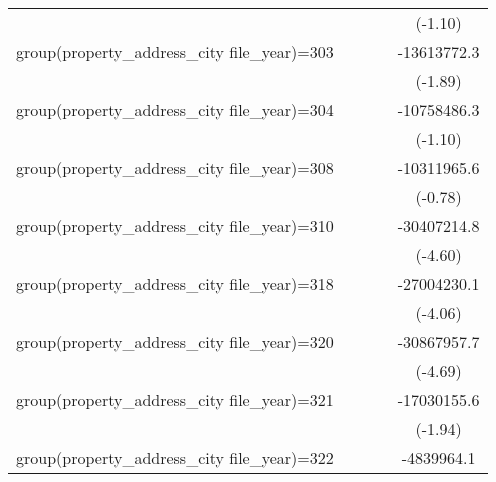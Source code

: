 {\begin{tabular}{l*{4}{c}}
                    &                     &                     &                     &     (-1.10)         \\
\addlinespace
group(property\_address\_city file\_year)=303&                     &                     &                     & -13613772.3         \\
                    &                     &                     &                     &     (-1.89)         \\
\addlinespace
group(property\_address\_city file\_year)=304&                     &                     &                     & -10758486.3         \\
                    &                     &                     &                     &     (-1.10)         \\
\addlinespace
group(property\_address\_city file\_year)=308&                     &                     &                     & -10311965.6         \\
                    &                     &                     &                     &     (-0.78)         \\
\addlinespace
group(property\_address\_city file\_year)=310&                     &                     &                     & -30407214.8\sym{***}\\
                    &                     &                     &                     &     (-4.60)         \\
\addlinespace
group(property\_address\_city file\_year)=318&                     &                     &                     & -27004230.1\sym{***}\\
                    &                     &                     &                     &     (-4.06)         \\
\addlinespace
group(property\_address\_city file\_year)=320&                     &                     &                     & -30867957.7\sym{***}\\
                    &                     &                     &                     &     (-4.69)         \\
\addlinespace
group(property\_address\_city file\_year)=321&                     &                     &                     & -17030155.6         \\
                    &                     &                     &                     &     (-1.94)         \\
\addlinespace
group(property\_address\_city file\_year)=322&                     &                     &                     &  -4839964.1         \\

\end{tabular}}
